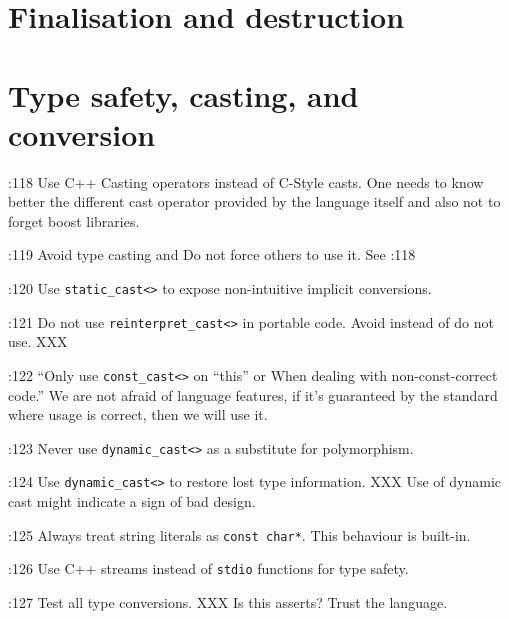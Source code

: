 \documentclass{book}
\newcommand{\name}[1]{\texttt{#1}}
\begin{document}
\chapter{Finalisation and destruction}
\label{cha:Finalisation}



\chapter{Type safety, casting, and conversion}
\label{cha:TypeSafty}

\cite{OKL_MisfeldtBumgardnerGray2004CppStyle}:118 Use C++ Casting operators instead of C-Style casts. One needs to know better the different cast operator provided by the language itself and also not to forget boost libraries.

\cite{OKL_MisfeldtBumgardnerGray2004CppStyle}:119 Avoid type casting and Do not force others to use it. See \cite{OKL_MisfeldtBumgardnerGray2004CppStyle}:118

\cite{OKL_MisfeldtBumgardnerGray2004CppStyle}:120 Use \name{static\_cast<>} to expose non-intuitive implicit conversions.

\cite{OKL_MisfeldtBumgardnerGray2004CppStyle}:121 Do not use \name{reinterpret\_cast<>} in portable code. Avoid instead of do not use. XXX

\cite{OKL_MisfeldtBumgardnerGray2004CppStyle}:122 ``Only use \name{const\_cast<>} on ``this'' or When dealing with non-const-correct code.'' We are not afraid of language features, if it's guaranteed by the standard where usage is correct, then we will use it.   

\cite{OKL_MisfeldtBumgardnerGray2004CppStyle}:123 Never use \name{dynamic\_cast<>} as a substitute for polymorphism.

\cite{OKL_MisfeldtBumgardnerGray2004CppStyle}:124 Use \name{dynamic\_cast<>} to restore lost type information. XXX Use of dynamic cast might indicate a sign of bad design. 

\cite{OKL_MisfeldtBumgardnerGray2004CppStyle}:125 Always treat string literals as \name{const char*}. This behaviour is built-in.

\cite{OKL_MisfeldtBumgardnerGray2004CppStyle}:126 Use C++ streams instead of \name{stdio} functions for type safety.

\cite{OKL_MisfeldtBumgardnerGray2004CppStyle}:127 Test all type conversions. XXX Is this asserts? Trust the language. 
\end{document}
